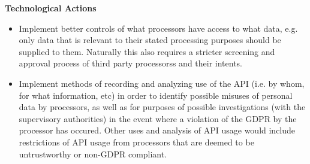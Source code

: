 \documentclass[a4paper]{article}
\begin{document}
\textbf{Technological Actions}
\begin{itemize}
  \item Implement better controls of what processors have access to what data, e.g. only data that is relevant to their stated processing purposes should be supplied to them. Naturally this also requires a stricter screening and approval process of third party processorss and their intents.
  \item Implement methods of recording and analyzing use of the API (i.e. by whom, for what information, etc) in order to identify possible misuses of personal data by processors, as well as for purposes of possible investigations (with the supervisory authorities) in the event where a violation of the GDPR by the processor has occured. Other uses and analysis of API usage would include restrictions of API usage from processors that are deemed to be untrustworthy or non-GDPR compliant.
\end{itemize}
\end{document}
